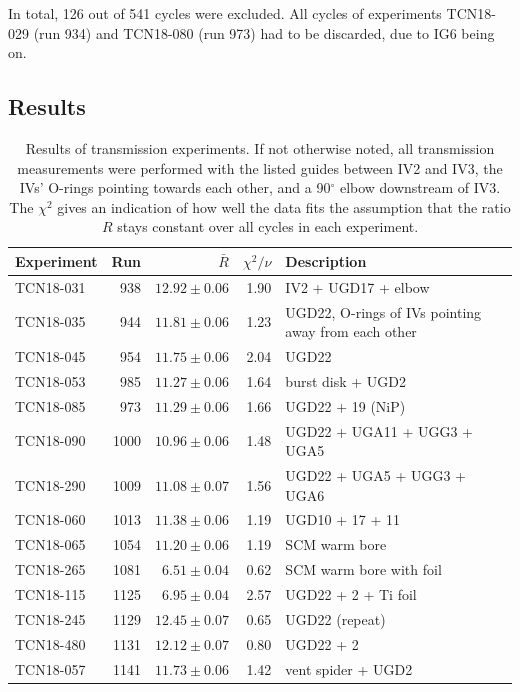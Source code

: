 \documentclass[10pt,letterpaper]{article}
\begin{document}
In total, 126 out of 541 cycles were excluded. All cycles of experiments TCN18-029 (run 934) and TCN18-080 (run 973) had to be discarded, due to IG6 being on.

\subsection{Results}

\begin{table}
\centering
\caption{Results of transmission experiments. If not otherwise noted, all transmission measurements were performed with the listed guides between IV2 and IV3, the IVs' O-rings pointing towards each other, and a 90$^\circ$ elbow downstream of IV3. The $\chi^2$ gives an indication of how well the data fits the assumption that the ratio $R$ stays constant over all cycles in each experiment.}
\begin{tabular}{l r r r p{}}
\toprule
Experiment & Run & $\bar{R}$ & $\chi^2/\nu$ & Description \\
\midrule
TCN18-031 & 938 & $12.92 \pm 0.06$ & 1.90 & IV2 + UGD17 + elbow \\
TCN18-035 & 944 & $11.81 \pm 0.06$ & 1.23 & UGD22, O-rings of IVs pointing away from each other \\
TCN18-045 & 954 & $11.75 \pm 0.06$ & 2.04 & UGD22 \\
TCN18-053 & 985 & $11.27 \pm 0.06$ & 1.64 & burst disk + UGD2 \\
TCN18-085 & 973 & $11.29 \pm 0.06$ & 1.66 & UGD22 + 19 (NiP) \\
TCN18-090 & 1000 & $10.96 \pm 0.06$ & 1.48 & UGD22 + UGA11 + UGG3 + UGA5 \\
TCN18-290 & 1009 & $11.08 \pm 0.07$ & 1.56 & UGD22 + UGA5 + UGG3 + UGA6 \\
TCN18-060 & 1013 & $11.38 \pm 0.06$ & 1.19 & UGD10 + 17 + 11 \\
TCN18-065 & 1054 & $11.20 \pm 0.06$ & 1.19 & SCM warm bore \\
TCN18-265 & 1081 & $6.51 \pm 0.04$ & 0.62 & SCM warm bore with foil \\
TCN18-115 & 1125 & $6.95 \pm 0.04$ & 2.57 & UGD22 + 2 + Ti foil \\
TCN18-245 & 1129 & $12.45 \pm 0.07$ & 0.65 & UGD22 (repeat) \\
TCN18-480 & 1131 & $12.12 \pm 0.07$ & 0.80 & UGD22 + 2 \\
TCN18-057 & 1141 & $11.73 \pm 0.06$ & 1.42 & vent spider + UGD2 \\
\midrule

\end{tabular}
\end{table}
\end{document}
